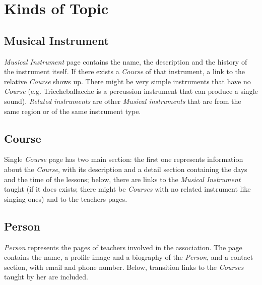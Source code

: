 \documentclass[../../DD.tex]{subfiles}
\begin{document}
\newpage
\section{Kinds of Topic}
	\subsection{Musical Instrument}
		\textit{Musical Instrument} page contains the name, the description and the history of the instrument itself. If there exists a \textit{Course} of that instrument, a link to the relative \textit{Course} shows up. There might be very simple instruments that have no \textit{Course} (e.g. Triccheballacche is a percussion instrument that can produce a single sound). \textit{Related instruments} are other \textit{Musical instruments} that are from the same region or of the same instrument type.
		\newline

	\newpage
	\subsection{Course}
		Single \textit{Course} page has two main section: the first one represents information about the \textit{Course}, with its description and a detail section containing the days and the time of the lessons; below, there are links to the \textit{Musical Instrument} taught (if it does exists; there might be \textit{Courses} with no related instrument like singing ones) and to the teachers pages.  
		\newline

	\newpage
	\subsection{Person}
		\textit{Person} represents the pages of teachers involved in the association. The page contains the name, a profile image and a biography of the \textit{Person}, and a contact section, with email and phone number. Below, transition links to the \textit{Courses} taught by her are included.
		\newline
\end{document}
